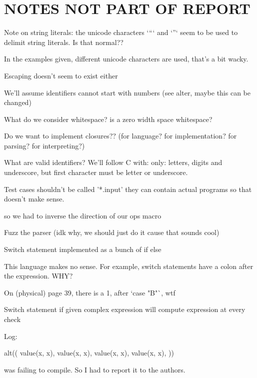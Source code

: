 \documentclass{article}
\begin{document}


\section{NOTES NOT PART OF REPORT}

Note on string literals: the unicode characters `“` and `”` seem to be used to
delimit string literals. Is that normal??

In the examples given, different unicode characters are used, that's a bit
wacky.

Escaping doesn't seem to exist either

We'll assume identifiers cannot start with numbers (see alter, maybe this can
be changed)

What do we consider whitespace? is a zero width space whitespace?

Do we want to implement closures?? (for language? for implementation? for parsing? for interpreting?)

What are valid identifiers? We'll follow C with: only: letters, digits and
underscore, but first character must be letter or underscore.

Test cases shouldn't be called '*.input' they can contain actual programs so
that doesn't make sense.


so we had to inverse the direction of our ops macro


Fuzz the parser (idk why, we should just do it cause that sounds cool)

Switch statement implemented as a bunch of if else

This language makes no sense. For example, switch statements have a colon after
the expression. WHY?

On (physical) page 39, there is a 1, after `case "B"`, wtf

Switch statement if given complex expression will compute expression at every
check

Log:


alt((
	value(x, x),
	value(x, x),
	value(x, x),
	value(x, x),
))

was failing to compile. So I had to report it to the authors.
\end{document}
